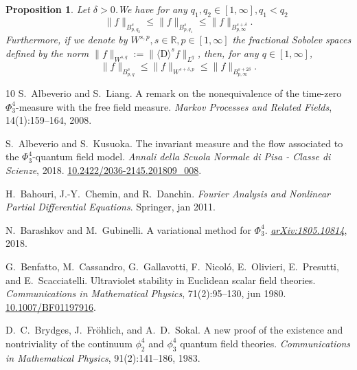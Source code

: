 \documentclass[11pt]{article}
\newcommand{\assign}{:=}
\newcommand{\mathD}{\mathrm{D}}
\newcommand{\tmtextit}[1]{{\itshape{#1}}}
\newtheorem{proposition}{Proposition}
{\theorembodyfont{\rmfamily}\newtheorem{remark}{Remark}}
\begin{document}
\begin{proposition}
  \label{besovembedding2}Let $\delta > 0$.We have for any $q_1, q_2 \in [1,
  \infty], q_1 < q_2$
  \[ \| f \|_{B_{p, q_2}^s} \leqslant \| f \|_{B_{p, q_1}^s} \leqslant \| f
     \|_{B_{p, \infty}^{s + \delta}} . \]
  Furthermore, if we denote by $W^{s, p}, s \in \mathbb{R}, p \in [1, \infty]$
  the fractional Sobolev spaces defined by the norm $\| f \|_{W^{s, q}}
  \assign \| \langle \mathD \rangle^s f \|_{L^q}$, then, for any $q \in [1,
  \infty]$,
  \[ \| f \|_{B_{p, q}^s} \leqslant \| f \|_{W^{s + \delta, p}} \leqslant \| f
     \|_{B_{p, \infty}^{s + 2 \delta}} . \]
\end{proposition}

\begin{thebibliography}{10}
  S.~Albeverio  and  S.~Liang. {\newblock}A
  remark on the nonequivalence of the time-zero $\Phi^4_3$-measure with the
  free field measure. {\newblock}\tmtextit{Markov Processes and Related
  Fields}, 14(1):159--164, 2008.{\newblock}
  
  S.~Albeverio  and  S.~Kusuoka.
  {\newblock}The invariant measure and the flow associated to the
  $\Phi^4_3$-quantum field model. {\newblock}\tmtextit{Annali della Scuola
  Normale di Pisa - Classe di Scienze}, 2018.
  {\newblock}\href{Https://doi.org/10.2422/2036-2145.201809_008}{10.2422/2036-2145.201809\_008}.{\newblock}
  
  H.~Bahouri, J.-Y.~Chemin, and  R.~Danchin.
  {\newblock}\tmtextit{Fourier Analysis and Nonlinear Partial Differential
  Equations}. {\newblock}Springer, jan 2011.{\newblock}
  
  N.~Barashkov  and  M.~Gubinelli.
  {\newblock}A variational method for $\Phi^4_3$.
  {\newblock}\tmtextit{\href{Http://arxiv.org/abs/1805.10814}{arXiv:1805.10814}},
  2018.{\newblock}
  
  G.~Benfatto, M.~Cassandro,
  G.~Gallavotti, F.~Nicol{\'o}, E.~Olivieri, E.~Presutti, and 
  E.~Scacciatelli. {\newblock}Ultraviolet stability in Euclidean scalar field
  theories. {\newblock}\tmtextit{Communications in Mathematical Physics},
  71(2):95--130, jun 1980.
  {\newblock}\href{Https://doi.org/10.1007/BF01197916}{10.1007/BF01197916}.{\newblock}
  
  D.~C.~Brydges, J.~Fr{\"o}hlich, and 
  A.~D.~Sokal. {\newblock}A new proof of the existence and nontriviality of
  the continuum $\phi^4_2$ and $\phi^4_3$ quantum field theories.
  {\newblock}\tmtextit{Communications in Mathematical Physics},
  91(2):141--186, 1983.{\newblock}
  

\end{thebibliography}
\end{document}

